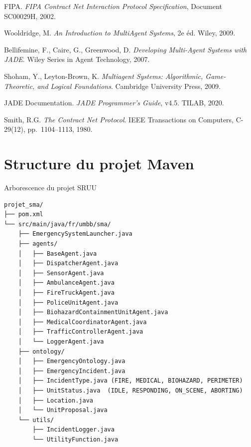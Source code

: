 \documentclass[12pt, a4paper]{report}
\begin{document}
\begin{enumerate}[leftmargin=*, label={[\arabic*]}, itemsep=5pt]
  \item FIPA. \textit{FIPA Contract Net Interaction Protocol Specification},
    Document SC00029H, 2002.
  \item Wooldridge, M. \textit{An Introduction to MultiAgent Systems}, 2e éd.
    Wiley, 2009.
  \item Bellifemine, F., Caire, G., Greenwood, D.
    \textit{Developing Multi-Agent Systems with JADE}.
    Wiley Series in Agent Technology, 2007.
  \item Shoham, Y., Leyton-Brown, K.
    \textit{Multiagent Systems: Algorithmic, Game-Theoretic, and Logical Foundations}.
    Cambridge University Press, 2009.
  \item JADE Documentation. \textit{JADE Programmer's Guide}, v4.5. TILAB, 2020.
  \item Smith, R.G. \textit{The Contract Net Protocol}.
    IEEE Transactions on Computers, C-29(12), pp.~1104--1113, 1980.
\end{enumerate}

\appendix
\chapter{Structure du projet Maven}

\begin{codebox}{Arborescence du projet SRUU}
\begin{lstlisting}[style=jsonStyle]
projet_sma/
├── pom.xml
└── src/main/java/fr/umbb/sma/
    ├── EmergencySystemLauncher.java
    ├── agents/
    │   ├── BaseAgent.java
    │   ├── DispatcherAgent.java
    │   ├── SensorAgent.java
    │   ├── AmbulanceAgent.java
    │   ├── FireTruckAgent.java
    │   ├── PoliceUnitAgent.java
    │   ├── BiohazardContainmentUnitAgent.java
    │   ├── MedicalCoordinatorAgent.java
    │   ├── TrafficControllerAgent.java
    │   └── LoggerAgent.java
    ├── ontology/
    │   ├── EmergencyOntology.java
    │   ├── EmergencyIncident.java
    │   ├── IncidentType.java (FIRE, MEDICAL, BIOHAZARD, PERIMETER)
    │   ├── UnitStatus.java  (IDLE, RESPONDING, ON_SCENE, ABORTING)
    │   ├── Location.java
    │   └── UnitProposal.java
    └── utils/
        ├── IncidentLogger.java
        └── UtilityFunction.java
\end{lstlisting}
\end{codebox}
\end{document}
